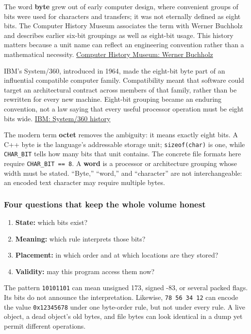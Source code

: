 The word \textbf{byte} grew out of early computer design, where convenient groups of bits were used for characters and transfers; it was not eternally defined as eight bits. The Computer History Museum associates the term with Werner Buchholz and describes earlier six-bit groupings as well as eight-bit usage. This history matters because a unit name can reflect an engineering convention rather than a mathematical necessity. \href{https://www.computerhistory.org/tdih/october/24/}{Computer History Museum: Werner Buchholz}

IBM's System/360, introduced in 1964, made the eight-bit byte part of an influential compatible computer family. Compatibility meant that software could target an architectural contract across members of that family, rather than be rewritten for every new machine. Eight-bit grouping became an enduring convention, not a law saying that every useful processor operation must be eight bits wide. \href{https://www.ibm.com/history/system-360}{IBM: System/360 history}

The modern term \textbf{octet} removes the ambiguity: it means exactly eight bits. A C++ byte is the language's addressable storage unit; \texttt{sizeof(char)} is one, while \texttt{CHAR\_BIT} tells how many bits that unit contains. The concrete file formats here require \texttt{CHAR\_BIT\ ==\ 8}. A \textbf{word} is a processor or architecture grouping whose width must be stated. ``Byte,'' ``word,'' and ``character'' are not interchangeable: an encoded text character may require multiple bytes.

\subsubsection{Four questions that keep the whole volume honest}\label{05-engine-i-ch001-four-questions-that-keep-the-whole-volume-honest}

\begin{enumerate}
\def\labelenumi{\arabic{enumi}.}
\tightlist
\item
  \textbf{State:} which bits exist?
\item
  \textbf{Meaning:} which rule interprets those bits?
\item
  \textbf{Placement:} in which order and at which locations are they stored?
\item
  \textbf{Validity:} may this program access them now?
\end{enumerate}

The pattern \texttt{10101101} can mean unsigned 173, signed -83, or several packed flags. Its bits do not announce the interpretation. Likewise, \texttt{78\ 56\ 34\ 12} can encode the value \texttt{0x12345678} under one byte-order rule, but not under every rule. A live object, a dead object's old bytes, and file bytes can look identical in a dump yet permit different operations.

